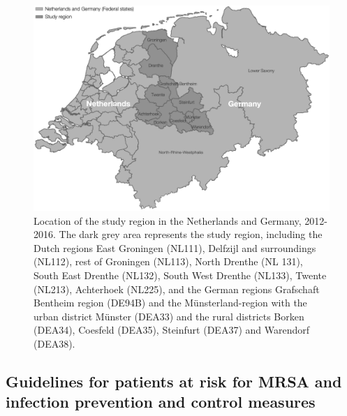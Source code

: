 \documentclass[
]{book}
\begin{document}
\begin{figure}

{\centering \includegraphics[width=1\linewidth]{images/09-01} 

}

\caption{Location of the study region in the Netherlands and Germany, 2012-2016. The dark grey area represents the study region, including the Dutch regions East Groningen (NL111), Delfzijl and surroundings (NL112), rest of Groningen (NL113), North Drenthe (NL 131), South East Drenthe (NL132), South West Drenthe (NL133), Twente (NL213), Achterhoek (NL225), and the German regions Grafschaft Bentheim region (DE94B) and the Münsterland-region with the urban district Münster (DEA33) and the rural districts Borken (DEA34), Coesfeld (DEA35), Steinfurt (DEA37) and Warendorf (DEA38).}\label{fig:fig9-1}
\end{figure}

\hypertarget{guidelines-for-patients-at-risk-for-mrsa-and-infection-prevention-and-control-measures}{%
\subsection{Guidelines for patients at risk for MRSA and infection prevention and control measures}\label{guidelines-for-patients-at-risk-for-mrsa-and-infection-prevention-and-control-measures}}
\end{document}
